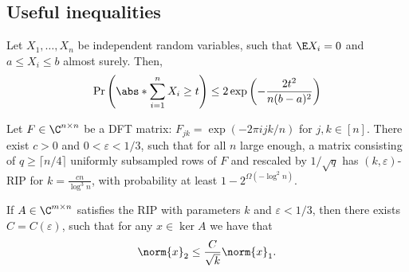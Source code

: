 \subsection{Useful inequalities}

\begin{lemma}
\label{lem:hoeffding}
    Let \(X_1, \ldots, X_n\) be independent random variables, such that \(\E X_i = 0\) and \(a \leq X_i \leq b\) almost surely. Then,
    \begin{equation}
        \Pr\left(\abs*{\sum_{i=1}^n X_i} \geq t\right) \leq 2\exp\left( - \frac{2 t^2}{n (b - a)^2}\right)
    \end{equation}
\end{lemma}

\begin{lemma}
\label{lem:rip_dft}
Let \(F \in \C^{n \times n}\) be a DFT matrix: \(F_{jk} = \exp(-2 \pi i jk/n)\) for \(j, k \in [n]\). There exist \(c > 0\) and \(0 < \varepsilon < 1 / 3\), such that for all \(n\) large enough, a matrix consisting of \(q \geq \lceil n / 4 \rceil\) uniformly subsampled rows of \(F\) and rescaled by \(1 / \sqrt{q}\) has \((k, \varepsilon)\)-RIP for \(k = \frac{c n}{\log^3 n}\), with probability at least \(1 - 2^{\Omega(-\log^2 n)}\).
\end{lemma}
\begin{lemma}
\label{lem:rip_l2l1}
    If \(A \in \C^{m \times n}\) satisfies the RIP with parameters \(k\) and \(\varepsilon < 1/3\), then there exists \(C = C(\varepsilon)\), such that for any \(x \in \ker{A}\) we have that 
    \begin{equation}
        \norm{x}_2 \leq \frac{C}{\sqrt{k}}\norm{x}_1.
    \end{equation}
\end{lemma}